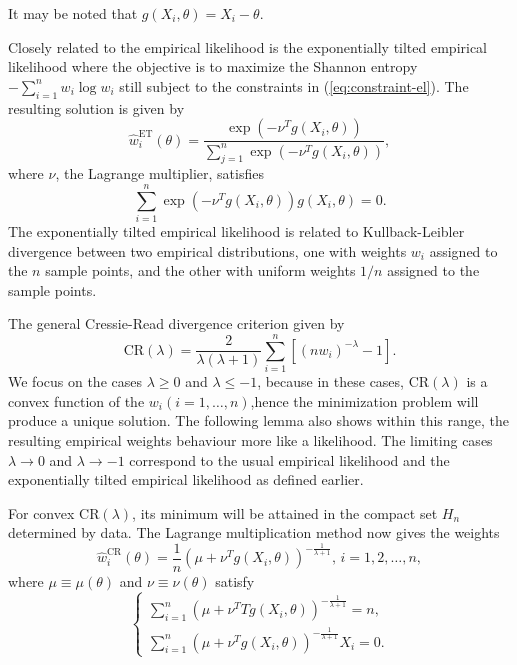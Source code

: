 It may be noted that \citet{fang2005expected,fang2006empirical} $g\left(X_{i},\theta\right)=X_{i}-\theta$. 

Closely related to the empirical likelihood is the exponentially tilted
empirical likelihood where the objective is to maximize the Shannon
entropy $-\sum_{i=1}^{n}w_{i}\log w_{i}$ still subject to the constraints
in (\ref{eq:constraint-el}). The resulting solution is given by 
\begin{equation}
\hat{w}_{i}^{\mathrm{ET}}\left(\theta\right)=\frac{\exp\left(-\nu^{T}g\left(X_{i},\theta\right)\right)}{\sum_{j=1}^{n}\exp\left(-\nu^{T}g\left(X_{i},\theta\right)\right)},\label{eq:sol-weight-etel}
\end{equation}
where $\nu$, the Lagrange multiplier, satisfies 
\begin{equation}
\sum_{i=1}^{n}\exp\left(-\nu^{T}g\left(X_{i},\theta\right)\right)g\left(X_{i},\theta\right)=0.\label{eq:lag-mul-exp-tilt-el}
\end{equation}
The exponentially tilted empirical likelihood is related to Kullback-Leibler
divergence between two empirical distributions, one with weights $w_{i}$
assigned to the $n$ sample points, and the other with uniform weights
$1/n$ assigned to the sample points. 

The general Cressie-Read divergence criterion given by 
\[
\mathrm{CR}\left(\lambda\right)=\frac{2}{\lambda\left(\lambda+1\right)}\sum_{i=1}^{n}\left[\left(nw_{i}\right)^{-\lambda}-1\right].
\]
We focus on the cases $\lambda\ge0$ and $\lambda\le-1$, because
in these cases, $\mathrm{CR}\left(\lambda\right)$ is a convex function
of the $w_{i}\left(i=1,\ldots,n\right)$,hence the minimization
problem will produce a unique solution. The following lemma also shows
within this range, the resulting empirical weights behaviour more
like a likelihood. The limiting cases $\lambda\rightarrow0$ and $\lambda\rightarrow-1$
correspond to the usual empirical likelihood and the exponentially
tilted empirical likelihood as defined earlier. 

For convex $\mathrm{CR}\left(\lambda\right)$, its minimum will be
attained in the compact set $H_{n}$ determined by data. The Lagrange
multiplication method now gives the weights 
\begin{equation}
\hat{w}_{i}^{\mathrm{CR}}\left(\theta\right)=\frac{1}{n}\left(\mu+\nu^{T}g\left(X_{i},\theta\right)\right)^{-\frac{1}{\lambda+1}},\, i=1,2,\ldots,n,\label{eq:weight-cr-el}
\end{equation}
where $\mu\equiv\mu\left(\theta\right)$ and $\nu\equiv\nu\left(\theta\right)$
satisfy 
\begin{equation}
\begin{cases}
\sum_{i=1}^{n}\left(\mu+\nu^{T}Tg\left(X_{i},\theta\right)\right)^{-\frac{1}{\lambda+1}}=n,\\
\sum_{i=1}^{n}\left(\mu+\nu^{T}g\left(X_{i},\theta\right)\right)^{-\frac{1}{\lambda+1}}X_{i}=0.
\end{cases}\label{eq:lag-mul-cr-el}
\end{equation}


